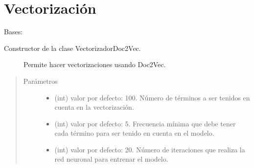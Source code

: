 \documentclass[letterpaper,10pt,openany,spanish]{sphinxmanual}
\begin{document}
\chapter{Vectorización}
\label{\detokenize{funciones/vectorizacion:module-vectorizacion}}\label{\detokenize{funciones/vectorizacion:vectorizacion}}\label{\detokenize{funciones/vectorizacion::doc}}

\begin{fulllineitems}
\label{\detokenize{funciones/vectorizacion:vectorizacion.VectorizadorDoc2Vec}}
Bases: 
\begin{description}
\item[{Constructor de la clase VectorizadorDoc2Vec.  }] \leavevmode
Permite hacer vectorizaciones usando Doc2Vec.

\end{description}
\begin{quote}\begin{description}
\item[{Parámetros}] \leavevmode\begin{itemize}
\item {} 
 \textendash{} (int) valor por defecto: 100. Número de términos 
a ser tenidos en cuenta en la vectorización.

\item {} 
 \textendash{} (int) valor por defecto: 5. Frecuencia 
mínima que debe tener cada término para ser tenido en cuenta 
en el modelo.

\item {} 
 \textendash{} (int) valor por defecto: 20. Número de iteraciones 
que realiza la red neuronal para entrenar el modelo.


\end{itemize}
\end{description}
\end{quote}
\end{fulllineitems}
\end{document}
